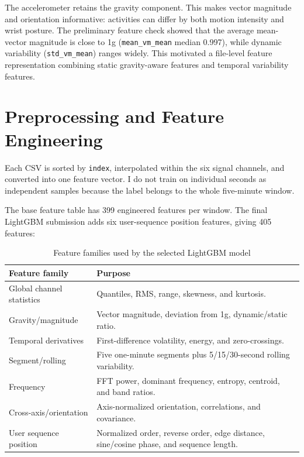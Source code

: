 \documentclass[11pt]{article}
\begin{document}
The accelerometer retains the gravity component. This makes vector magnitude and
orientation informative: activities can differ by both motion intensity and wrist
posture. The preliminary feature check showed that the average mean-vector
magnitude is close to 1g (\texttt{mean\_vm\_mean} median 0.997), while dynamic
variability (\texttt{std\_vm\_mean}) ranges widely. This motivated a file-level
feature representation combining static gravity-aware features and temporal
variability features.

\section{Preprocessing and Feature Engineering}

Each CSV is sorted by \texttt{index}, interpolated within the six signal channels,
and converted into one feature vector. I do not train on individual seconds as
independent samples because the label belongs to the whole five-minute window.

The base feature table has 399 engineered features per window. The final
LightGBM submission adds six user-sequence position features, giving 405
features:

\begin{table}[H]
\centering
\caption{Feature families used by the selected LightGBM model\label{tab:features}}
\begin{tabular}{p{}p{}}
\toprule
Feature family & Purpose \\
\midrule
Global channel statistics & Quantiles, RMS, range, skewness, and kurtosis. \\
Gravity/magnitude & Vector magnitude, deviation from 1g, dynamic/static ratio. \\
Temporal derivatives & First-difference volatility, energy, and zero-crossings. \\
Segment/rolling & Five one-minute segments plus 5/15/30-second rolling variability. \\
Frequency & FFT power, dominant frequency, entropy, centroid, and band ratios. \\
Cross-axis/orientation & Axis-normalized orientation, correlations, and covariance. \\
User sequence position & Normalized order, reverse order, edge distance, sine/cosine phase, and sequence length. \\
\bottomrule
\end{tabular}
\end{table}
\end{document}
